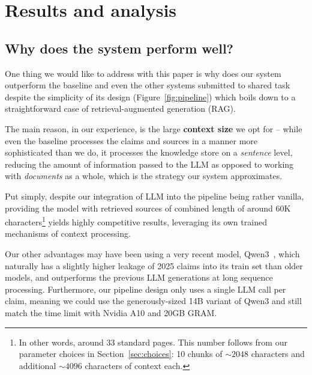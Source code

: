 
\section{Results and analysis}
\label{sec:results}
\label{nothink}

\subsection{Why does the system perform well?}
\label{sec:why}
One thing we would like to address with this paper is why does our system outperform the \averitec{} baseline and even the other systems submitted to \averitec{} shared task despite the simplicity of its design (Figure~\ref{fig:pipeline}) which boils down to a straightforward case of retrieval-augmented generation (RAG).

The main reason, in our experience, is the large \textbf{context size} we opt for -- while even the \averitec{} baseline processes the claims and sources in a manner more sophisticated than we do, it processes the knowledge store on a \textit{sentence} level, reducing the amount of information passed to the LLM as opposed to working with \textit{documents} as a whole, which is the strategy our system approximates.

Put simply, despite our integration of LLM into the pipeline being rather vanilla, providing the model with retrieved sources of combined length of around 60K characters\footnote{In other words, around 33 standard pages. This number follows from our parameter choices in Section~\ref{sec:choices}: 10 chunks of $\sim2048$ characters and additional $\sim4096$ characters of context each.} yields highly competitive results, leveraging its own trained mechanisms of context processing.

Our other advantages may have been using a very recent model, Qwen3~\cite{yang2025qwen3technicalreport}, which naturally has a slightly higher leakage of 2025 claims into its train set than older models, and outperforms the previous LLM generations at long sequence processing. Furthermore, our pipeline design only uses a single LLM call per claim, meaning we could use the generously-sized 14B variant of Qwen3 and still match the time limit with Nvidia A10 and 20GB GRAM.